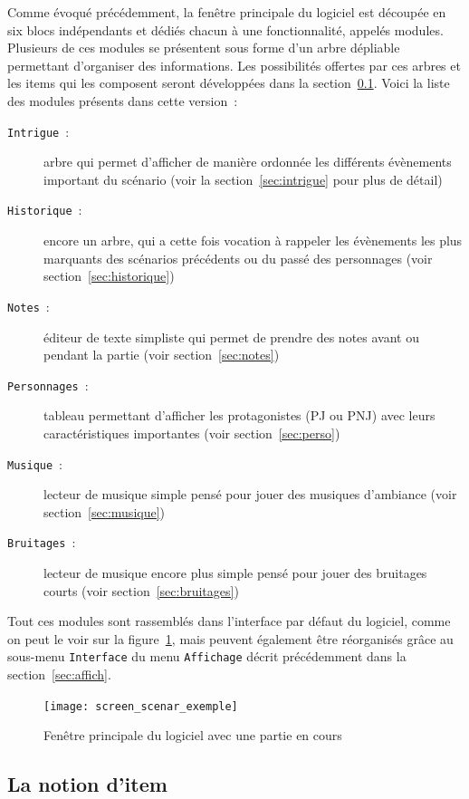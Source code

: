 \documentclass[a4paper,12pt]{article}
\newcommand*{\interfaceitem}[1]{\texttt{#1}}
\newcommand*{\guillemets}[1]{\og #1\fg{}\xspace}
\begin{document}
Comme évoqué précédemment, la fenêtre principale du logiciel est découpée en six blocs indépendants et dédiés chacun à une fonctionnalité, appelés modules.
Plusieurs de ces modules se présentent sous forme d'un arbre \guillemets{dépliable} permettant d'organiser des informations.
Les possibilités offertes par ces arbres et les items qui les composent seront développées dans la section~\ref{item}.
Voici la liste des modules présents dans cette version~:
\begin{description}
    \item[\interfaceitem{Intrigue}~:]{arbre qui permet d'afficher de manière ordonnée les différents évènements important du scénario (voir la section~\ref{sec:intrigue} pour plus de détail)}
    \item[\interfaceitem{Historique}~:]{encore un arbre, qui a cette fois vocation à rappeler les évènements les plus marquants des scénarios précédents ou du passé des personnages (voir section~\ref{sec:historique})}
    \item[\interfaceitem{Notes}~:]{éditeur de texte simpliste qui permet de prendre des notes avant ou pendant la partie (voir section~\ref{sec:notes})}
    \item[\interfaceitem{Personnages}~:]{tableau permettant d'afficher les protagonistes (PJ ou PNJ) avec leurs caractéristiques importantes (voir section~\ref{sec:perso})}
    \item[\interfaceitem{Musique}~:]{lecteur de musique simple pensé pour jouer des musiques d'ambiance (voir section~\ref{sec:musique})}
    \item[\interfaceitem{Bruitages}~:]{lecteur de musique encore plus simple pensé pour jouer des bruitages courts (voir section~\ref{sec:bruitages})}
\end{description}
Tout ces modules sont rassemblés dans l'interface par défaut du logiciel, comme on peut le voir sur la figure~\ref{fig:interface}, mais peuvent également être réorganisés grâce au sous-menu \interfaceitem{Interface} du menu \interfaceitem{Affichage} décrit précédemment dans la section~\ref{sec:affich}.
\begin{figure}[h]
    \texttt{[image: screen\_scenar\_exemple]}
    \caption{Fenêtre principale du logiciel avec une partie en cours}
    \label{fig:interface}
\end{figure}

\subsection{La notion d'item}
\label{item}
\end{document}
